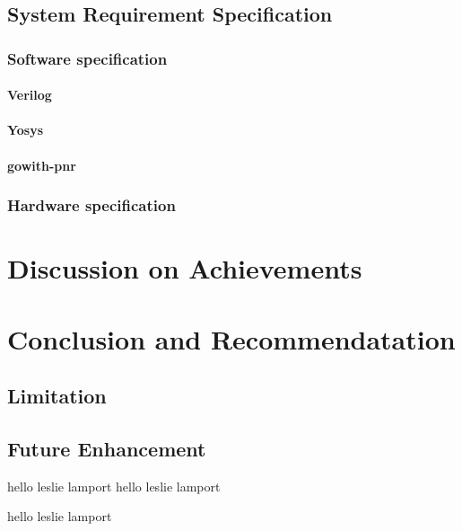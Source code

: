 \documentclass[a4paper,12pt]{article}
\begin{document}
    \subsection{System Requirement Specification}
    \subsubsection{Software specification}
    \paragraph{Verilog}
    \paragraph{Yosys}
    \paragraph{gowith-pnr}
    \subsubsection{Hardware specification}

    \newpage
    \section{Discussion on Achievements}

    \newpage
    \section{Conclusion and Recommendatation}
    \subsection{Limitation}

    \subsection{Future Enhancement}

    hello leslie lamport 
     hello leslie lamport 

    hello leslie lamport 


\end{document}
